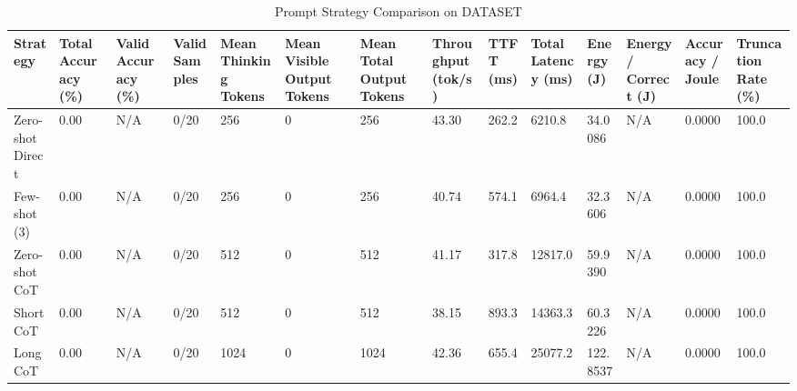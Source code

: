 \begin{table}
\caption{Prompt Strategy Comparison on DATASET}
\label{tab:strategy_comparison}
\begin{tabular}{llllllllllllll}
\toprule
Strategy & Total Accuracy (\%) & Valid Accuracy (\%) & Valid Samples & Mean Thinking Tokens & Mean Visible Output Tokens & Mean Total Output Tokens & Throughput (tok/s) & TTFT (ms) & Total Latency (ms) & Energy (J) & Energy / Correct (J) & Accuracy / Joule & Truncation Rate (\%) \\
\midrule
Zero-shot Direct & 0.00 & N/A & 0/20 & 256 & 0 & 256 & 43.30 & 262.2 & 6210.8 & 34.0086 & N/A & 0.0000 & 100.0 \\
Few-shot (3) & 0.00 & N/A & 0/20 & 256 & 0 & 256 & 40.74 & 574.1 & 6964.4 & 32.3606 & N/A & 0.0000 & 100.0 \\
Zero-shot CoT & 0.00 & N/A & 0/20 & 512 & 0 & 512 & 41.17 & 317.8 & 12817.0 & 59.9390 & N/A & 0.0000 & 100.0 \\
Short CoT & 0.00 & N/A & 0/20 & 512 & 0 & 512 & 38.15 & 893.3 & 14363.3 & 60.3226 & N/A & 0.0000 & 100.0 \\
Long CoT & 0.00 & N/A & 0/20 & 1024 & 0 & 1024 & 42.36 & 655.4 & 25077.2 & 122.8537 & N/A & 0.0000 & 100.0 \\
\bottomrule
\end{tabular}
\end{table}
